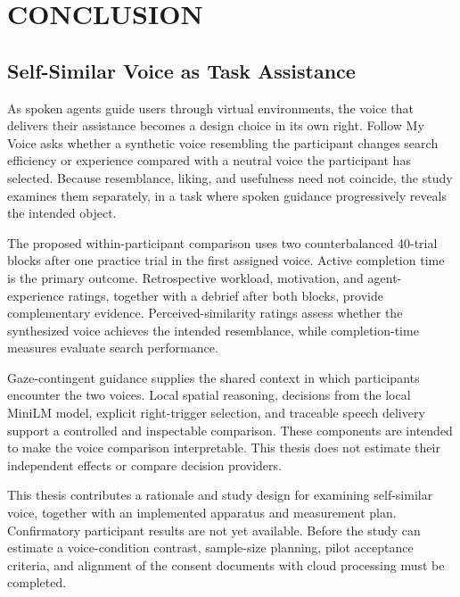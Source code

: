 \chapter{CONCLUSION}
\label{ch:conclusion}
\section{Self-Similar Voice as Task Assistance}
As spoken agents guide users through virtual environments, the voice that delivers their assistance becomes a design choice in its own right. Follow My Voice asks whether a synthetic voice resembling the participant changes search efficiency or experience compared with a neutral voice the participant has selected. Because resemblance, liking, and usefulness need not coincide, the study examines them separately, in a task where spoken guidance progressively reveals the intended object.

The proposed within-participant comparison uses two counterbalanced 40-trial blocks after one practice trial in the first assigned voice. Active completion time is the primary outcome. Retrospective workload, motivation, and agent-experience ratings, together with a debrief after both blocks, provide complementary evidence. Perceived-similarity ratings assess whether the synthesized voice achieves the intended resemblance, while completion-time measures evaluate search performance.

Gaze-contingent guidance supplies the shared context in which participants encounter the two voices. Local spatial reasoning, decisions from the local MiniLM model, explicit right-trigger selection, and traceable speech delivery support a controlled and inspectable comparison. These components are intended to make the voice comparison interpretable. This thesis does not estimate their independent effects or compare decision providers.

This thesis contributes a rationale and study design for examining self-similar voice, together with an implemented apparatus and measurement plan. Confirmatory participant results are not yet available. Before the study can estimate a voice-condition contrast, sample-size planning, pilot acceptance criteria, and alignment of the consent documents with cloud processing must be completed.

